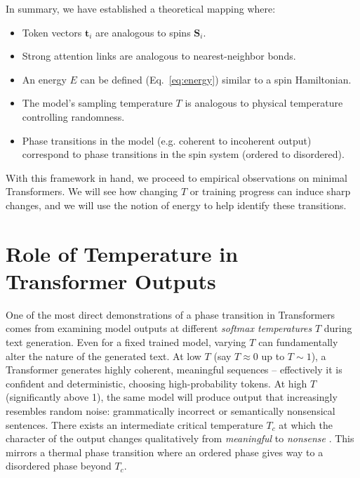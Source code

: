 \documentclass[12pt]{article}
\begin{document}
In summary, we have established a theoretical mapping where:
\begin{itemize}
    \item Token vectors $\mathbf{t}_i$ are analogous to spins $\mathbf{S}_i$.
    \item Strong attention links are analogous to nearest-neighbor bonds.
    \item An energy $E$ can be defined (Eq.~\ref{eq:energy}) similar to a spin Hamiltonian.
    \item The model’s sampling temperature $T$ is analogous to physical temperature controlling randomness.
    \item Phase transitions in the model (e.g. coherent to incoherent output) correspond to phase transitions in the spin system (ordered to disordered).
\end{itemize}
With this framework in hand, we proceed to empirical observations on minimal Transformers. We will see how changing $T$ or training progress can induce sharp changes, and we will use the notion of energy to help identify these transitions.

\section{Role of Temperature in Transformer Outputs}
One of the most direct demonstrations of a phase transition in Transformers comes from examining model outputs at different \emph{softmax temperatures} $T$ during text generation. Even for a fixed trained model, varying $T$ can fundamentally alter the nature of the generated text. At low $T$ (say $T \approx 0$ up to $T \sim 1$), a Transformer generates highly coherent, meaningful sequences -- effectively it is confident and deterministic, choosing high-probability tokens. At high $T$ (significantly above 1), the same model will produce output that increasingly resembles random noise: grammatically incorrect or semantically nonsensical sentences. There exists an intermediate critical temperature $T_c$ at which the character of the output changes qualitatively from \emph{meaningful} to \emph{nonsense} \citep{sun2025}. This mirrors a thermal phase transition where an ordered phase gives way to a disordered phase beyond $T_c$.
\end{document}
